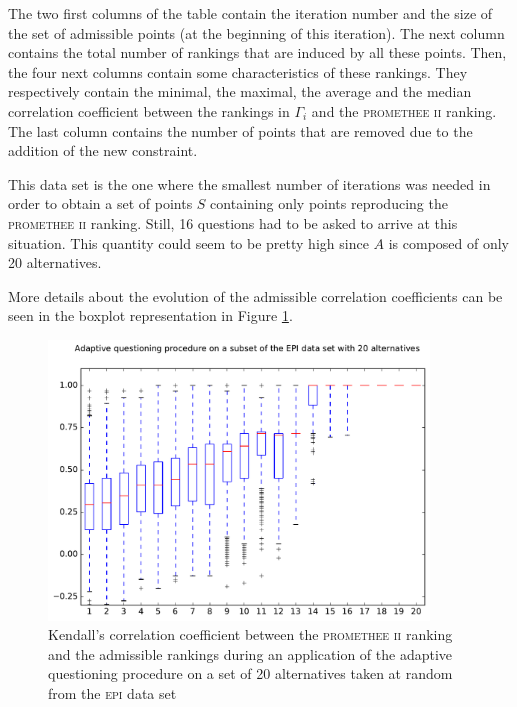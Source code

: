 The two first columns of the table contain the iteration number and the size of the set of admissible points (at the beginning of this iteration).
The next column contains the total number of rankings that are induced by all these points.
Then, the four next columns contain some characteristics of these rankings.
They respectively contain the minimal, the maximal, the average and the median correlation coefficient between the rankings in $\Gamma_i$ and the \textsc{promethee ii} ranking.
The last column contains the number of points that are removed due to the addition of the new constraint.

This data set is the one where the smallest number of iterations was needed in order to obtain a set of points $S$ containing only points reproducing the \textsc{promethee ii} ranking.
Still, 16 questions had to be asked to arrive at this situation.
This quantity could seem to be pretty high since $A$ is composed of only 20 alternatives.



More details about the evolution of the admissible correlation coefficients can be seen in the boxplot representation in Figure \ref{fig:boxplot_epi_seed_1}.

\begin{figure}[!h]
    \centering
    \includegraphics[width=0.9\textwidth]{referenced_promethee/src/boxplot_epi_seed_1.pdf}
    \caption{Kendall's correlation coefficient between the \textsc{promethee ii} ranking and the admissible rankings during an application of the adaptive questioning procedure on a set of 20 alternatives taken at random from the \textsc{epi} data set}
    \label{fig:boxplot_epi_seed_1}
\end{figure}

